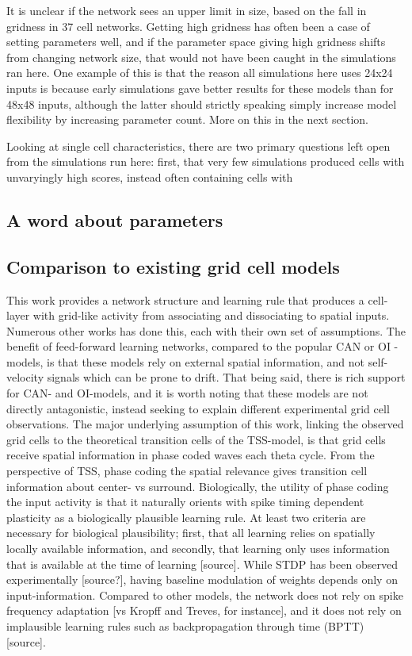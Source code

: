 \documentclass{article}
\begin{document}
    It is unclear if the network sees an upper limit in size, based on the fall in gridness in 37 cell networks. Getting high gridness has often been a case of setting parameters well, and if the parameter space giving high gridness shifts from changing network size, that would not have been caught in the simulations ran here. One example of this is that the reason all simulations here uses 24x24 inputs is because early simulations gave better results for these models than for 48x48 inputs, although the latter should strictly speaking simply increase model flexibility by increasing parameter count. More on this in the next section.

    Looking at single cell characteristics, there are two primary questions left open from the simulations run here: first, that very few simulations produced cells with unvaryingly high scores, instead often containing cells with 


    \subsection{A word about parameters}

    \subsection{Comparison to existing grid cell models}

    This work provides a network structure and learning rule that produces a cell-layer with grid-like activity from associating and dissociating to spatial inputs. Numerous other works has done this, each with their own set of assumptions. The benefit of feed-forward learning networks, compared to the popular CAN or OI -models, is that these models rely on external spatial information, and not self-velocity signals which can be prone to drift. That being said, there is rich support for CAN- and OI-models, and it is worth noting that these models are not directly antagonistic, instead seeking to explain different experimental grid cell observations.
    The major underlying assumption of this work, linking the observed grid cells to the theoretical transition cells of the TSS-model, is that grid cells receive spatial information in phase coded waves each theta cycle. From the perspective of TSS, phase coding the spatial relevance gives transition cell information about center- vs surround. Biologically, the utility of phase coding the input activity is that it naturally orients with spike timing dependent plasticity as a biologically plausible learning rule. At least two criteria are necessary for biological plausibility; first, that all learning relies on spatially locally available information, and secondly, that learning only uses information that is available at the time of learning [source]. While STDP has been observed experimentally [source?], having baseline modulation of weights depends only on input-information.  Compared to other models, the network does not rely on spike frequency adaptation [vs Kropff and Treves, for instance], and it does not rely on implausible learning rules such as backpropagation through time (BPTT) [source].
\end{document}

